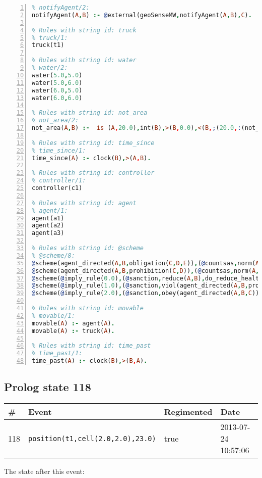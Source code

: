 \documentclass[11pt]{article}\usepackage[utf8]{inputenc}\usepackage{geometry}
\begin{document}
\begin{lstlisting}[language=Prolog, numbers=left]
% Rules with string id: notifyAgent
% notifyAgent/2:
notifyAgent(A,B) :- @external(geoSenseMW,notifyAgent(A,B),C).

% Rules with string id: truck
% truck/1:
truck(t1)

% Rules with string id: water
% water/2:
water(5.0,5.0)
water(5.0,6.0)
water(6.0,5.0)
water(6.0,6.0)

% Rules with string id: not_area
% not_area/2:
not_area(A,B) :-  is (A,20.0),int(B),>(B,0.0),<(B,;(20.0,:(not_area(A,B), is (-(B),20.0)))),int(A),>(A,0.0),<(A,;(20.0,:(area(A,B),-(int(A))))),int(B),>(A,0.0),>(B,0.0),<(A,21.0),<(B,21.0).

% Rules with string id: time_since
% time_since/1:
time_since(A) :- clock(B),>(A,B).

% Rules with string id: controller
% controller/1:
controller(c1)

% Rules with string id: agent
% agent/1:
agent(a1)
agent(a2)
agent(a3)

% Rules with string id: @scheme
% @scheme/8:
@scheme(agent_directed(A,B,obligation(C,D,E)),(@countsas,norm(A,B,F,obligation(C,D,E)),F),false,(listTrue(C)),(time_past(D)),false,[plus(viol(agent_directed(A,B,obligation(C,D,E))))|[]],[plus(obey(agent_directed(A,B,obligation(C,D,E))))|[]])
@scheme(agent_directed(A,B,prohibition(C,D)),(@countsas,norm(A,B,E,prohibition(C,D)),E),(listTrue(C)),false,(false),false,[plus(viol(agent_directed(A,B,prohibition(C,D))))|[]],[plus(obey(agent_directed(A,B,prohibition(C,D))))|[]])
@scheme(@imply_rule(0.0),(@sanction,reduce(A,B),do_reduce_health(A,B),notifyAgent(A,changed(status))),true,false,false,false,[min(reduce(A,B))|[]],[])
@scheme(@imply_rule(1.0),(@sanction,viol(agent_directed(A,B,prohibition(C,D))),do_sanction(D)),true,false,false,false,[min(viol(agent_directed(A,B,prohibition(C,D))))|[]],[])
@scheme(@imply_rule(2.0),(@sanction,obey(agent_directed(A,B,C))),true,false,false,false,[min(obey(agent_directed(A,B,C)))|[]],[])

% Rules with string id: movable
% movable/1:
movable(A) :- agent(A).
movable(A) :- truck(A).

% Rules with string id: time_past
% time_past/1:
time_past(A) :- clock(B),>(B,A).

\end{lstlisting}
\clearpage 
\subsection{Prolog state 118}
\begin{table}[ht]
\centering 
\begin{tabular}{l l l l} 
\textbf{\#} & \textbf{Event} & \textbf{Regimented} & \textbf{Date} \\ [0.5ex] 
\hline
118&\texttt{position(t1,cell(2.0,2.0),23.0)}&true&2013-07-24 10:57:06\\ [1ex] \hline\end{tabular}
\end{table}
The state after this event:
\end{document}
